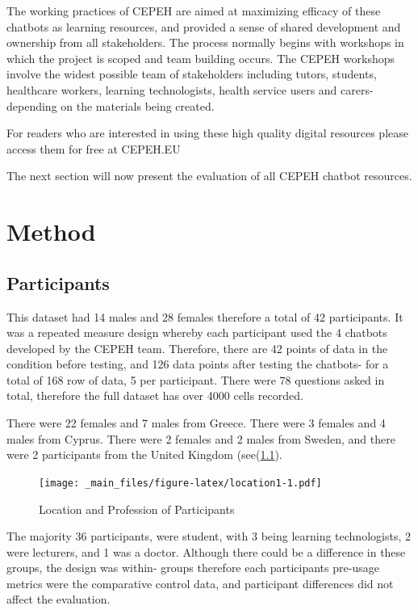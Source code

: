 \documentclass[a4paper, nobind]{templates/ociamthesis}
\begin{document}
The working practices of CEPEH are aimed at maximizing efficacy of these chatbots as learning resources, and provided a sense of shared development and ownership from all stakeholders.
The process normally begins with workshops in which the project is scoped and team building occurs.
The CEPEH workshops involve the widest possible team of stakeholders including tutors, students, healthcare workers, learning technologists, health service users and carers- depending on the materials being created.

For readers who are interested in using these high quality digital resources please access them for free at CEPEH.EU

The next section will now present the evaluation of all CEPEH chatbot resources.

\hypertarget{method}{%
\chapter{Method}\label{method}}

\minitoc 

\hypertarget{participants}{%
\section{Participants}\label{participants}}

This dataset had 14 males and 28 females therefore a total of 42 participants.
It was a repeated measure design whereby each participant used the 4 chatbots developed by the CEPEH team.
Therefore, there are 42 points of data in the condition before testing, and 126 data points after testing the chatbots- for a total of 168 row of data, 5 per participant.
There were 78 questions asked in total, therefore the full dataset has over 4000 cells recorded.

There were 22 females and 7 males from Greece.
There were 3 females and 4 males from Cyprus.
There were 2 females and 2 males from Sweden,
and there were 2 participants from the United Kingdom (see(\ref{fig:location1}).

\begin{figure}
\centering
\texttt{[image: \_main\_files/figure-latex/location1-1.pdf]}
\caption{\label{fig:location1}Location and Profession of Participants}
\end{figure}

The majority 36 participants, were student, with 3 being learning technologists, 2 were lecturers, and 1 was a doctor.
Although there could be a difference in these groups, the design was within- groups therefore each participants pre-usage metrics were the comparative control data, and participant differences did not affect the evaluation.
\end{document}
